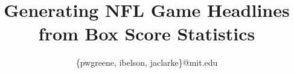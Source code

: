\documentclass[journal]{IEEEtran}
\begin{document}
%
\title{Generating NFL Game Headlines from Box Score Statistics}
%
%
%

\author{\{pwgreene, ibelson, jaclarke\}@mit.edu}

% 
%



% 




\end{document}
